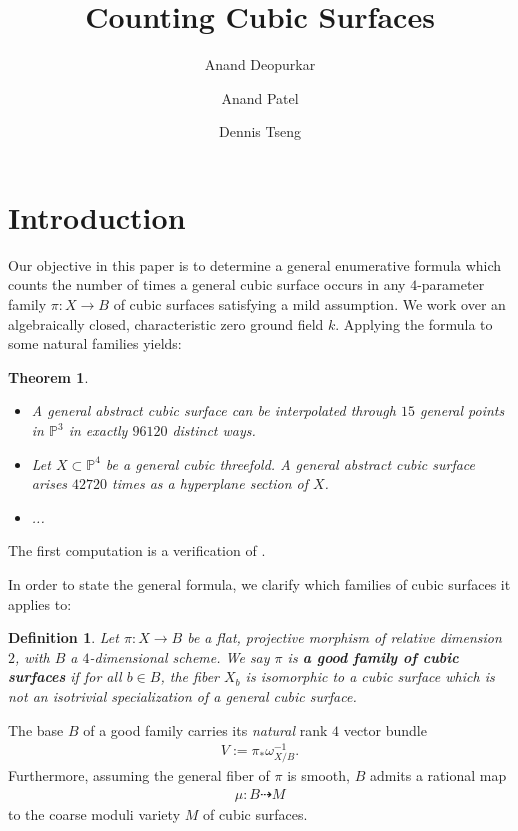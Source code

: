 \documentclass[12 pt]{amsart}
\title{Counting Cubic Surfaces}
\author{Anand Deopurkar \and Anand Patel \and Dennis Tseng}
\newtheorem{theorem}{Theorem}[section]
\newtheorem{definition}{Definition}[section]
\renewcommand{\P}{\mathbb{P}}
\newcommand{\<}{\left\langle}
\renewcommand{\>}{\right\rangle}
\begin{document}
\maketitle


\section{Introduction}
\label{sec:intro}
Our objective in this paper is to determine a general enumerative
formula which counts the number of times a general cubic surface
occurs in any $4$-parameter family $ \pi: X \to B$ of cubic surfaces
satisfying a mild assumption.  We work over an algebraically closed,
characteristic zero ground field $k$.  Applying the formula to some
natural families yields:

\begin{theorem}
  \begin{itemize}
  \item[(A)] A general abstract cubic surface can be
    interpolated through $15$ general points in $\P^3$ in exactly
    $96120$ distinct ways.
  \item[(B)] Let $X \subset \P^{4}$ be a general cubic
    threefold. A general abstract cubic surface arises $42720$ times
    as a hyperplane section of $X$.
    \item[(C)]... 
    \end{itemize}
\end{theorem}

The first computation is a verification of \cite{}.  

In order to state the general formula, we clarify which families of
cubic surfaces it applies to:

\begin{definition}
\label{def:goodfamily}
Let $\pi :X \to B$ be a flat, projective morphism of relative
dimension $2$, with $B$ a $4$-dimensional scheme. We say $\pi$ is {\bf
  a good family of cubic surfaces} if for all $b \in B$, the fiber
$X_{b}$ is isomorphic to a cubic surface which is not an isotrivial
specialization of a general cubic surface.
\end{definition}

The base $B$ of a good family carries its {\sl natural} rank $4$
vector bundle
\begin{align}
  \label{eq:V}
  V := \pi_{*}\omega_{X/B}^{-1}.
\end{align}
Furthermore, assuming the general fiber of $\pi$ is smooth, $B$ admits
a rational map
\begin{align}
  \label{eq:mu}
  \mu: B \dashrightarrow M
\end{align}
to the coarse moduli variety $M$ of cubic surfaces.
\end{document}
